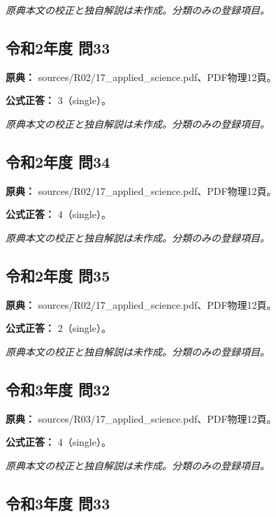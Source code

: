 \par\textit{原典本文の校正と独自解説は未作成。分類のみの登録項目。}

\subsection{令和2年度 問33}
\label{q:r02-reg-applied-33}

\noindent\textbf{原典：} sources/R02/17\_applied\_science.pdf、PDF物理12頁。

\textbf{公式正答：} 3（single）。

\par\textit{原典本文の校正と独自解説は未作成。分類のみの登録項目。}

\subsection{令和2年度 問34}
\label{q:r02-reg-applied-34}

\noindent\textbf{原典：} sources/R02/17\_applied\_science.pdf、PDF物理12頁。

\textbf{公式正答：} 4（single）。

\par\textit{原典本文の校正と独自解説は未作成。分類のみの登録項目。}

\subsection{令和2年度 問35}
\label{q:r02-reg-applied-35}

\noindent\textbf{原典：} sources/R02/17\_applied\_science.pdf、PDF物理12頁。

\textbf{公式正答：} 2（single）。

\par\textit{原典本文の校正と独自解説は未作成。分類のみの登録項目。}

\subsection{令和3年度 問32}
\label{q:r03-reg-applied-32}

\noindent\textbf{原典：} sources/R03/17\_applied\_science.pdf、PDF物理12頁。

\textbf{公式正答：} 4（single）。

\par\textit{原典本文の校正と独自解説は未作成。分類のみの登録項目。}

\subsection{令和3年度 問33}
\label{q:r03-reg-applied-33}


